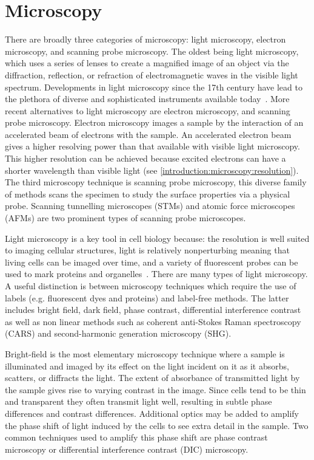 \section{Microscopy}
\label{introduction:microscopy}
There are broadly three categories of microscopy: light microscopy, electron microscopy, and scanning probe microscopy. The oldest being light microscopy, which uses a series of lenses to create a magnified image of an object via the diffraction, reflection, or refraction of electromagnetic waves in the visible light spectrum. Developments in light microscopy since the 17th century have lead to the plethora of diverse and sophisticated instruments available today~\cite{Spector2006}. More recent alternatives to light microscopy are electron microscopy, and scanning probe microscopy. Electron microscopy images a sample by the interaction of an accelerated beam of electrons with the sample. An accelerated electron beam gives a higher resolving power than that available with visible light microscopy. This higher resolution can be achieved because excited electrons can have a shorter wavelength than visible light (see \autoref{introduction:microscopy:resolution}). The third microscopy technique is scanning probe microscopy, this diverse family of methods scans the specimen to study the surface properties via a physical probe. Scanning tunnelling microscopes (STMs) and atomic force microscopes (AFMs) are two prominent types of scanning probe microscopes.

Light microscopy is a key tool in cell biology because: the resolution is well suited to imaging cellular structures, light is relatively nonperturbing meaning that living cells can be imaged over time, and a variety of fluorescent probes can be used to  mark proteins and organelles~\cite{Thorn2016}. There are many types of light microscopy. A useful distinction is between microscopy techniques which require the use of labels (e.g. fluorescent dyes and proteins) and label-free methods. The latter includes bright field, dark field, phase contrast, differential interference contrast as well as non linear methods such as coherent anti-Stokes Raman spectroscopy (CARS) and second-harmonic generation microscopy (SHG).

Bright-field is the most elementary microscopy technique where a sample is illuminated and imaged by its effect on the light incident on it as it absorbs, scatters, or diffracts the light. The extent of absorbance of transmitted light by the sample gives rise to varying contrast in the image. Since cells tend to be thin and transparent they often transmit light well, resulting in subtle phase differences and contrast differences. Additional optics may be added to amplify the phase shift of light induced by the cells to see extra detail in the sample. Two common techniques used to amplify this phase shift are phase contrast microscopy or differential interference contrast (DIC) microscopy.

